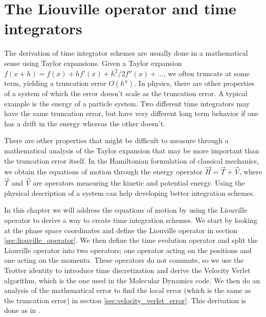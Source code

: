 \chapter{The Liouville operator and time integrators}
\label{app:liouville}
The derivation of time integrator schemes are usually done in a mathematical sense using Taylor expansions. Given a Taylor expansion $f(x+h) = f(x) + hf'(x) + h^2/2f''(x) + ...$, we often truncate at some term, yielding a truncation error $O(h^n)$. In physics, there are other properties of a system of which the error doesn't scale as the truncation error. A typical example is the energy of a particle system. Two different time integrators may have the same truncation error, but have very different long term behavior if one has a drift in the energy whereas the other doesn't.

There are other properties that might be difficult to measure through a mathematical analysis of the Taylor expansion that may be more important than the truncation error itself. In the Hamiltonian formulation of classical mechanics, we obtain the equations of motion through the energy operator $\vec H = \vec T + \vec V$, where $\vec T$ and $\vec V$ are operators measuring the kinetic and potential energy. Using the physical description of a system can help developing better integration schemes.

In this chapter we will address the equations of motion by using the Liouville operator to derive a way to create time integration schemes. We start by looking at the phase space coordinates and define the Liouville operator in section \ref{sec:liouville_operator}. We then define the time evolution operator and split the Liouville operator into two operators; one operator acting on the positions and one acting on the momenta.  These operators do not commute, so we use the Trotter identity to introduce time discretization and derive the Velocity Verlet algorithm, which is the one used in the Molecular Dynamics code. We then do an analysis of the mathematical error to find the local error (which is the same as the truncation error) in section \ref{sec:velocity_verlet_error}. This derivation is done as in \cite{frenkel2001understanding}. 

